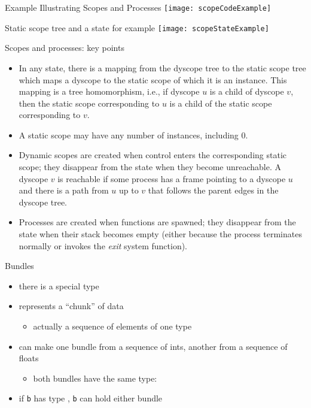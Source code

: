 \documentclass[t]{beamer}
\begin{document}
\begin{frame}{Example Illustrating Scopes and Processes}
  \texttt{[image: scopeCodeExample]}
\end{frame}

\begin{frame}{Static scope tree and a state for example}
  \texttt{[image: scopeStateExample]}
\end{frame}

\begin{frame}{Scopes and processes: key points}
\begin{itemize}
\item In any state, there is a mapping from the dyscope tree to the
  static scope tree which maps a dyscope to the static scope of which
  it is an instance.  This mapping is a \alert{tree homomorphism},
  i.e., if dyscope $u$ is a child of dyscope $v$, then the static
  scope corresponding to $u$ is a child of the static scope
  corresponding to $v$.
\item A static scope may have any number of instances, including 0.
\item Dynamic scopes are created when control enters the corresponding
  static scope; they disappear from the state when they become
  unreachable.  A dyscope $v$ is \alert{reachable} if some process has a
  frame pointing to a dyscope $u$ and there is a path from $u$ up to
  $v$ that follows the parent edges in the dyscope tree.
\item Processes are created when functions are spawned; they disappear
  from the state when their stack becomes empty (either because the
  process terminates normally or invokes the \alert{\emph{exit}}
  system function).
\end{itemize}
\end{frame}

\begin{frame}{Bundles}
  \begin{itemize}
  \item there is a special \cbundle{} type
  \item represents a ``chunk'' of data
    \begin{itemize}
    \item actually a sequence of elements of one type
    \end{itemize}
  \item can make one bundle from a sequence of ints, another from a
    sequence of floats
    \begin{itemize}
    \item both bundles have the same type: \cbundle
    \end{itemize}
  \item if \texttt{b} has type \cbundle, \texttt{b} can hold either
    bundle
  \end{itemize}
\end{frame}
\end{document}
